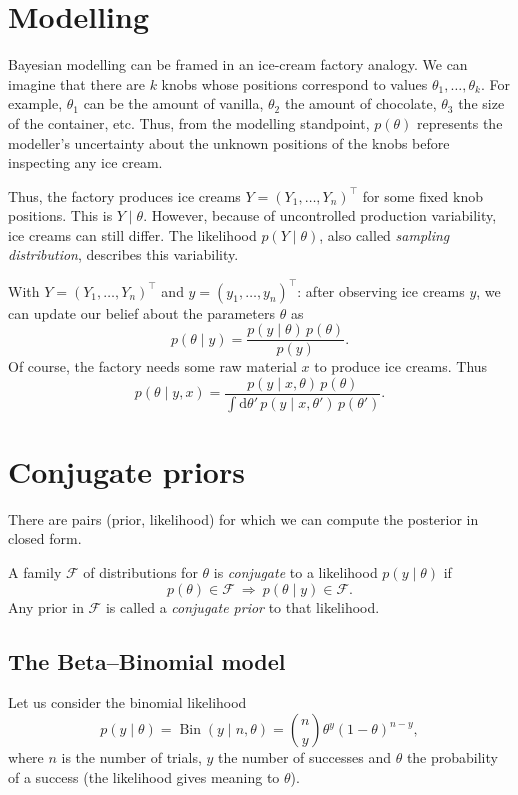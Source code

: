 \section{Modelling}
Bayesian modelling can be framed in an ice-cream factory analogy. We can imagine that there are $k$ knobs whose positions correspond to values $\theta_1, \dots, \theta_k$. For example, $\theta_1$ can be the amount of vanilla, $\theta_2$ the amount of chocolate, $\theta_3$ the size of the container, etc. Thus, from the modelling standpoint, $p(\theta)$ represents the modeller's uncertainty about the unknown positions of the knobs before inspecting any ice cream.

Thus, the factory produces ice creams $Y = (Y_1, \dots, Y_n)^{\top}$ for some fixed knob positions. This is $Y \mid \theta$. However, because of uncontrolled production variability, ice creams can still differ. The likelihood $p(Y \mid \theta)$, also called \emph{sampling distribution}, describes this variability.

With $Y = (Y_1, \dots, Y_n)^{\top}$ and $y = (y_1, \dots, y_n)^{\top}$: after observing ice creams $y$, we can update our belief about the parameters $\theta$ as
\[
p(\theta \mid y) = \frac{p(y \mid \theta)\,p(\theta)}{p(y)}.
\]
Of course, the factory needs some raw material $x$ to produce ice creams. Thus
\[
p(\theta \mid y, x) = \frac{p(y \mid x, \theta)\,p(\theta)}{\int \mathrm{d}\theta'\,p(y \mid x, \theta')\,p(\theta')}.
\]

\section{Conjugate priors}
There are pairs (prior, likelihood) for which we can compute the posterior in closed form.

A family $\mathcal{F}$ of distributions for $\theta$ is \emph{conjugate} to a likelihood $p(y \mid \theta)$ if
\[
p(\theta) \in \mathcal{F} \ \Rightarrow\ p(\theta \mid y) \in \mathcal{F}.
\]
Any prior in $\mathcal{F}$ is called a \emph{conjugate prior} to that likelihood.

\subsection{The Beta--Binomial model}
Let us consider the binomial likelihood
\[
p(y \mid \theta) = \operatorname{Bin}(y \mid n, \theta) = \binom{n}{y}\theta^{y}(1-\theta)^{n-y},
\]
where $n$ is the number of trials, $y$ the number of successes and $\theta$ the probability of a success (the likelihood gives meaning to $\theta$).

